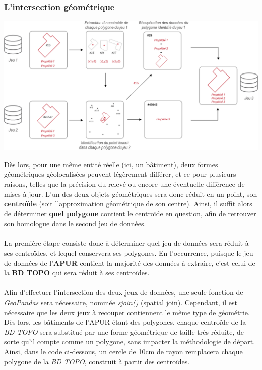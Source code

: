 \documentclass[
  11pt,
  french,
]{article}
\newcounter{customfigs}[section]
\newenvironment{customfigs}[1][] {
    \stepcounter{customfigs}
    Fig \arabic{section}. \arabic{customfigs} : }
\newcommand{\masked}{\vspace*{-\baselineskip}}
\begin{document}
\newpage

\hypertarget{lintersection-guxe9omuxe9trique}{%
\subsubsection{L'intersection
géométrique}\label{lintersection-guxe9omuxe9trique}}

\begin{tcolorbox}[title=\begin{customfigs} Principe de l'agrégation géométrique \end{customfigs}]

\begin{center}\includegraphics[width=1\linewidth]{__imgs/principe_agg} \end{center}

\end{tcolorbox}

\hfill\break
Dès lors, pour une même entité réelle (ici, un bâtiment), deux formes
géométriques géolocalisées peuvent légèrement différer, et ce pour
plusieurs raisons, telles que la précision du relevé ou encore une
éventuelle différence de mises à jour. L'un des deux objets géométriques
sera donc réduit en un point, son \textbf{centroïde} (soit
l'approximation géométrique de son centre). Ainsi, il suffit alors de
déterminer \textbf{quel polygone} contient le centroïde en question,
afin de retrouver son homologue dans le second jeu de données.\\
~\\
La première étape consiste donc à déterminer quel jeu de données sera
réduit à ses centroïdes, et lequel conservera ses polygones. En
l'occurrence, puisque le jeu de données de l'\textbf{APUR} contient la
majorité des données à extraire, c'est celui de la \textbf{BD TOPO} qui
sera réduit à ses centroïdes.\\
~\\
Afin d'effectuer l'intersection des deux jeux de données, une seule
fonction de \emph{GeoPandas} sera nécessaire, nommée \emph{sjoin()}
(spatial join). Cependant, il est nécessaire que les deux jeux à
recouper contiennent le même type de géométrie. Dès lors, les bâtiments
de l'APUR étant des polygones, chaque centroïde de la \emph{BD TOPO}
sera substitué par une forme géométrique de taille très réduite, de
sorte qu'il compte comme un polygone, sans impacter la méthodologie de
départ. Ainsi, dans le code ci-dessous, un cercle de 10cm de rayon
remplacera chaque polygone de la \emph{BD TOPO}, construit à partir des
centroïdes.
\end{document}

